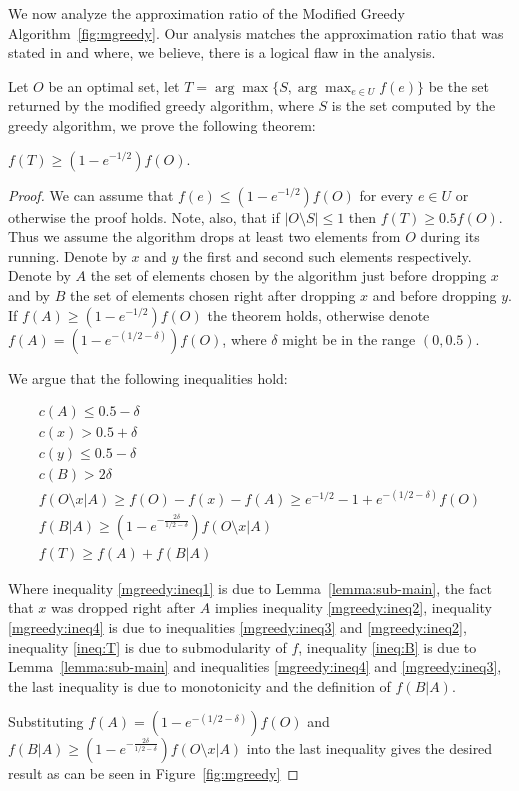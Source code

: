 We now analyze the approximation ratio of the
Modified Greedy Algorithm~\ref{fig:mgreedy}.
Our analysis matches the approximation ratio that was stated in
\cite{khuller1999budgeted} and \cite{krause2005note} where, we believe, 
there is a logical flaw in the analysis.


Let $O$ be an optimal set, let $T = \arg\max\{S, \displaystyle{\arg\max_{e \in U}}f(e)\}$
be the set returned by the modified greedy algorithm,
where $S$ is the set computed by the greedy algorithm,
we prove the following theorem:

\begin{theorem}
	$f(T) \geq (1 - e^{-1/2})f(O)$.
\end{theorem}

\begin{proof}
	We can assume that $f(e) \leq (1 - e^{-1/2})f(O)$ for every $e \in U$ or otherwise the proof holds.
	Note, also, that if $|O \setminus S| \leq 1$ then $f(T) \geq 0.5f(O)$.
	Thus we assume the algorithm drops at least two elements from $O$ during its running.
	Denote by $x$ and $y$ the first and second such elements respectively.
	Denote by $A$ the set of elements chosen by the algorithm just before dropping $x$ and by
	$B$ the set of elements chosen right after dropping $x$ and before dropping $y$.
	If $f(A) \geq (1 - e^{-1/2})f(O)$ the theorem holds, otherwise denote $f(A) = (1 - e^{-(1/2 - \delta)})f(O)$,
	where $\delta$ might be in the range $(0, 0.5)$.

	We argue that the following inequalities hold:

	\begin{align}
		\label{mgreedy:ineq1}
		c(A) \leq 0.5 - \delta
		\\
		\label{mgreedy:ineq2}
		c(x) > 0.5 + \delta
		\\
		\label{mgreedy:ineq3}
		c(y) \leq 0.5 - \delta
		\\
		\label{mgreedy:ineq4}
		c(B) > 2\delta
		\\
		\label{ineq:T}
		f(O \setminus x | A) \geq f(O) - f(x) - f(A) \geq e^{-1/2} - 1 + e^{-(1/2 - \delta)}f(O)
		\\
		\label{ineq:B}
		f(B|A) \geq (1 - e^{-\frac{2\delta}{1/2 - \delta}})f(O \setminus x | A)
		\\
		f(T) \geq f(A) + f(B|A)
	\end{align}

	Where inequality \ref{mgreedy:ineq1} is due to Lemma~\ref{lemma:sub-main},
	the fact that $x$ was dropped right after $A$ implies inequality \ref{mgreedy:ineq2},
	inequality \ref{mgreedy:ineq4} is due to inequalities \ref{mgreedy:ineq3} and
	\ref{mgreedy:ineq2},
	inequality \ref{ineq:T} is due to submodularity of $f$,
	inequality \ref{ineq:B} is due to Lemma~\ref{lemma:sub-main} and inequalities
	\ref{mgreedy:ineq4} and \ref{mgreedy:ineq3},
	the last inequality is due to monotonicity and the definition of $f(B|A)$.

	Substituting $f(A) = (1 - e^{-(1/2 - \delta)})f(O)$
	and $f(B|A) \geq (1 - e^{-\frac{2\delta}{1/2 - \delta}})f(O \setminus x | A)$
	into the last inequality gives the desired result as can be seen in Figure~\ref{fig:mgreedy}
\end{proof}

